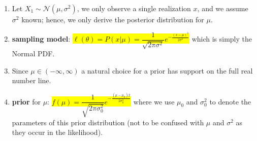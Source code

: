 \begin{enumerate}
    \item Let $X_1 \sim \mathcal{N} (\mu, \sigma^2)$, we only observe a single realization $x$, and we assume $\sigma^2$ known; hence, we only derive the posterior distribution for $\mu$.
    \hfill \cite{statistics/book/Statistics-for-Data-Scientists/Maurits-Kaptein}

    \item \textbf{sampling model}: 
    \colorbox{yellow}{$
        \ell(\theta) 
        = P(x|\mu)
        = \dfrac{1}{\sqrt{2\pi\sigma^2}} e ^{-\tfrac{(x-\mu)^2}{ 2\sigma^2 }}
    $}
    which is simply the Normal PDF.
    \hfill \cite{statistics/book/Statistics-for-Data-Scientists/Maurits-Kaptein}

    \item Since $\mu \in (-\infty, \infty)$ a natural choice for a prior has support on the full real number line.
    \hfill \cite{statistics/book/Statistics-for-Data-Scientists/Maurits-Kaptein}

    \item \textbf{prior} for $\mu$: 
    \colorbox{yellow}{$
        f (\mu) 
        = \dfrac{1 }{\sqrt{2\pi\sigma^2 _0}} e ^{-\tfrac{(\mu-\mu_0 )2} {2\sigma^2 _0} }
    $}
    where we use $\mu_0$ and $\sigma^2 _0$ to denote the parameters of this prior distribution (not to be confused with $\mu$ and $\sigma^2$ as they occur in the likelihood).
    \hfill \cite{statistics/book/Statistics-for-Data-Scientists/Maurits-Kaptein}


\end{enumerate}
